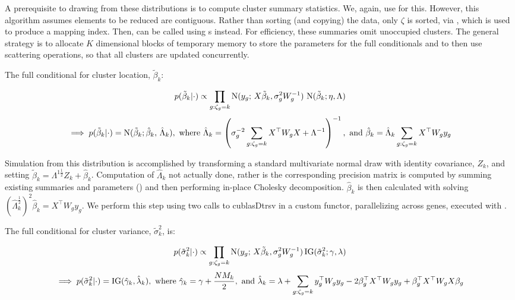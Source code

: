 A prerequisite to drawing from these distributions is to compute cluster summary statistics. We, again, use  for this. However, this algorithm assumes elements to be reduced are contiguous. Rather than sorting (and copying) the data, only $\zeta$ is sorted, via , which is used to produce a mapping index. Then,  can be called using s instead. For efficiency, these summaries omit unoccupied clusters. The general strategy is to allocate $K$ dimensional blocks of temporary memory to store the parameters for the full conditionals and to then use scattering operations, so that all clusters are updated concurrently. 

The full conditional for cluster location, $\tilde{\beta}_k$:

\begin{equation}
p(\tilde{\beta}_k|\cdot) \propto \prod_{g:\zeta_g=k} \operatorname{N}(y_g;\,X\tilde{\beta}_k, \sigma^2_gW^{-1}_g)\,\operatorname{N}(\tilde{\beta}_k; \eta, \Lambda)
\end{equation}
\begin{equation*}
\implies p(\tilde{\beta}_k|\cdot) = \operatorname{N}(\tilde{\beta}_k; \hat{\beta}_k,\, \hat{\Lambda}_k), \mbox{ where }\hat{\Lambda}_k= \left( \sigma^{-2}_g\sum_{g:\zeta_g=k} X^\top W_g X + \Lambda^{-1} \right)^{-1}, \mbox{ and }\hat{\beta}_k=\hat{\Lambda}_k \sum_{g:\zeta_g=k} X^\top W_g y_g
\end{equation*}

Simulation from this distribution is accomplished by transforming a standard multivariate normal draw with identity covariance, $Z_k$, and setting $\tilde{\beta}_k = \Lambda^{1\frac{1}{2}} Z_k + \hat{\beta}_k$. Computation of $\hat{\Lambda}_k$ not actually done, rather is the corresponding precision matrix is computed by summing existing summaries  and parameters () and then performing in-place Cholesky decomposition. $\hat{\beta}_k$ is then calculated with solving  $(\hat{\Lambda}_k^{\frac{1}{2}})^2\hat{\beta}_k=X^\top W_g y_g$. We perform this step using two calls to cublasDtrsv in a custom functor, parallelizing across genes, executed with .


The full conditional for cluster variance, $\tilde{\sigma}_k^2$, is:

\begin{equation}
p(\tilde{\sigma}_k^2|\cdot) \propto \prod_{g:\zeta_g=k} \operatorname{N}(y_g;\,X\tilde{\beta}_k, \sigma^2_gW^{-1}_g) \operatorname{IG}(\tilde{\sigma}_k^2; \gamma, \lambda)
\end{equation}
\begin{equation*}
\implies p(\tilde{\sigma}_k^2|\cdot) = \operatorname{IG}(\hat{\gamma}_k,\hat{\lambda}_k), \mbox{ where }\hat{\gamma}_k = \gamma + \frac{NM_k}{2},\mbox{ and }\hat{\lambda}_k= \lambda + \sum_{g:\zeta_g=k}y_g^\top W_g y_g -2 \beta_g^\top X^\top W_g y_g  +\beta_g^\top X^\top W_g X \beta_g
\end{equation*}

